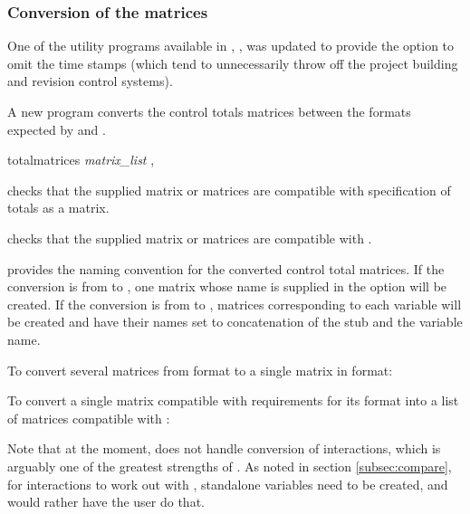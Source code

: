 \subsubsection{Conversion of the matrices}

One of the utility programs available in \citet{kolenikov:2014}, ,
was updated to provide the  option to omit the time stamps
(which tend to unnecessarily throw off the project building and revision control systems).

A new program  converts the control totals matrices between
the formats expected by  and . 

\begin{stsyntax}
totalmatrices
{\it matrix\_list}
,
\end{stsyntax}

\hangpara
{} checks that the supplied matrix or matrices are compatible with  
specification of totals as a matrix.

\hangpara
{} checks that the supplied matrix or matrices are compatible with .

\hangpara
{} provides the naming convention for the converted control total matrices.
If the conversion is from  to , one matrix whose name is supplied in 
the  option will be created. If the conversion is from  to 
, matrices corresponding to each variable will be created and have their names
set to concatenation of the stub and the variable name.

To convert several matrices from  format to a single matrix 
in  format:

\begin{stlog}
\nullskip
\end{stlog}

To convert a single matrix compatible with  requirements for its 
 format into a list of matrices compatible with
:

\begin{stlog}
\nullskip
\end{stlog}

Note that at the moment,  does not handle conversion
of interactions, which is arguably one of the greatest strengths of .
As noted in section \ref{subsec:compare}, for interactions to work out with ,
standalone variables need to be created, and  would rather
have the user do that.

